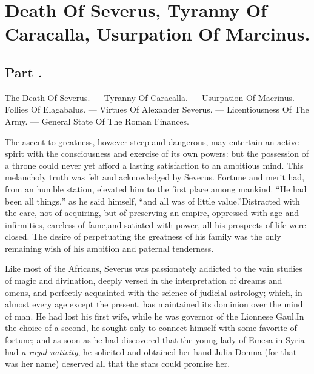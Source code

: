 \chapter{Death Of Severus, Tyranny Of Caracalla, Usurpation Of Marcinus.}
\section{Part \thesection.}

The Death Of Severus. — Tyranny Of Caracalla. — Usurpation Of
Macrinus. — Follies Of Elagabalus. — Virtues Of Alexander
Severus. — Licentiousness Of The Army. — General State Of The Roman
Finances.
\vspace{\onelineskip}

The ascent to greatness, however steep and dangerous, may
entertain an active spirit with the consciousness and exercise of
its own powers: but the possession of a throne could never yet
afford a lasting satisfaction to an ambitious mind. This
melancholy truth was felt and acknowledged by Severus. Fortune
and merit had, from an humble station, elevated him to the first
place among mankind. “He had been all things,” as he said
himself, “and all was of little value.”\footnotemark[1] Distracted with the
care, not of acquiring, but of preserving an empire, oppressed
with age and infirmities, careless of fame,\footnotemark[2] and satiated with
power, all his prospects of life were closed. The desire of
perpetuating the greatness of his family was the only remaining
wish of his ambition and paternal tenderness.



Like most of the Africans, Severus was passionately addicted to
the vain studies of magic and divination, deeply versed in the
interpretation of dreams and omens, and perfectly acquainted with
the science of judicial astrology; which, in almost every age
except the present, has maintained its dominion over the mind of
man. He had lost his first wife, while he was governor of the
Lionnese Gaul.\footnotemark[3] In the choice of a second, he sought only to
connect himself with some favorite of fortune; and as soon as he
had discovered that the young lady of Emesa in Syria had \textit{a royal
nativity}, he solicited and obtained her hand.\footnotemark[4] Julia Domna (for
that was her name) deserved all that the stars could promise her.

